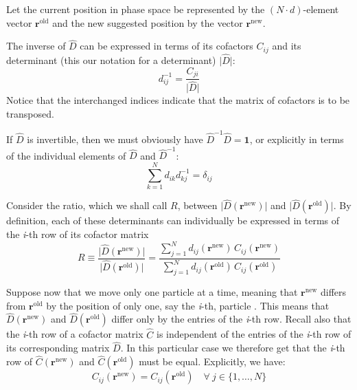 \documentclass[graybox,sectrefs,envcountresetchap,open=right]{svmonodo}
\begin{document}
Let the current position in phase space be represented by the $(N\cdot d)$-element 
vector $\mathbf{r}^{\mathrm{old}}$ and the new suggested
position by the vector $\mathbf{r}^{\mathrm{new}}$.

The inverse of $\hat{D}$ can be expressed in terms of its
cofactors $C_{ij}$ and its determinant (this our notation for a determinant) $\vert\hat{D}\vert$:
\begin{equation}
d_{ij}^{-1} = \frac{C_{ji}}{\vert\hat{D}\vert}
\label{eq:inverse_cofactor}
\end{equation}
Notice that the interchanged indices indicate that the matrix of cofactors is to be transposed.








If $\hat{D}$ is invertible, then we must obviously have $\hat{D}^{-1}\hat{D}= \mathbf{1}$, or explicitly in terms of the individual
elements of $\hat{D}$ and $\hat{D}^{-1}$:
\begin{equation}
\sum_{k=1}^N d_{ik}^{\phantom X}d_{kj}^{-1} = \delta_{ij}^{\phantom X}
\label{eq:unity_explicitely}
\end{equation}








Consider the ratio, which we shall call $R$, between $\vert\hat{D}(\mathbf{r}^{\mathrm{new}})\vert$ and $\vert\hat{D}(\mathbf{r}^{\mathrm{old}})\vert$. 
By definition, each of these determinants can
individually be expressed in terms of the \emph{i}-th row of its cofactor
matrix
\begin{equation}
R\equiv\frac{\vert\hat{D}(\mathbf{r}^{\mathrm{new}})\vert}
{\vert\hat{D}(\mathbf{r}^{\mathrm{old}})\vert} =
\frac{\sum_{j=1}^N d_{ij}(\mathbf{r}^{\mathrm{new}})\,
C_{ij}(\mathbf{r}^{\mathrm{new}})}
{\sum_{j=1}^N d_{ij}(\mathbf{r}^{\mathrm{old}})\,
C_{ij}(\mathbf{r}^{\mathrm{old}})}
\label{eq:detratio_cofactors}
\end{equation}







Suppose now that we move only one particle  at a time, meaning that
$\mathbf{r}^{\mathrm{new}}$ differs from $\mathbf{r}^{\mathrm{old}}$ by the
position of only one, say the \emph{i}-th, particle . This means that $\hat{D}(\mathbf{r}^{\mathrm{new}})$ and $\hat{D}(\mathbf{r}^{\mathrm{old}})$ differ
only by the entries of the \emph{i}-th row.  Recall also that the \emph{i}-th row
of a cofactor matrix $\hat{C}$ is independent of the entries of the
\emph{i}-th row of its corresponding matrix $\hat{D}$. In this particular
case we therefore get that the \emph{i}-th row of $\hat{C}(\mathbf{r}^{\mathrm{new}})$ 
and $\hat{C}(\mathbf{r}^{\mathrm{old}})$ must be
equal. Explicitly, we have:
\begin{equation}
C_{ij}(\mathbf{r}^{\mathrm{new}}) = C_{ij}(\mathbf{r}^{\mathrm{old}})\quad
\forall\ j\in\{1,\dots,N\}
\end{equation}
\end{document}
